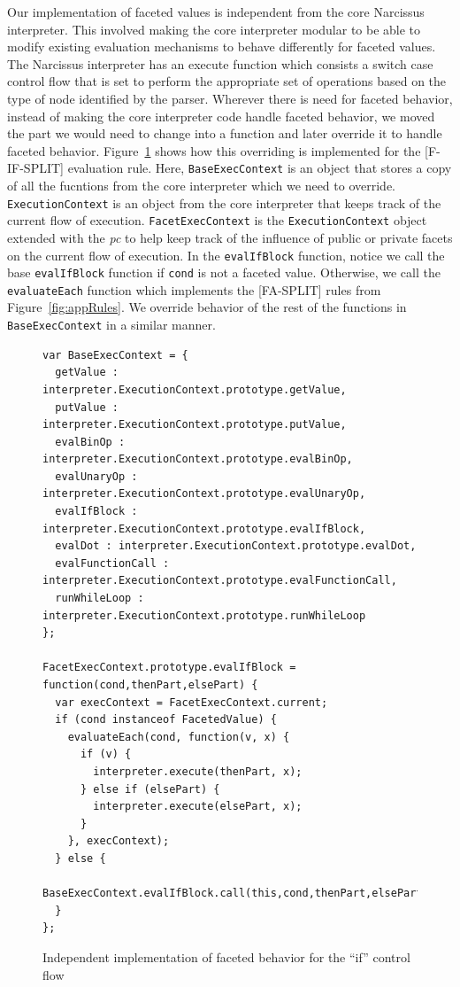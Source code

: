 Our implementation of faceted values is independent from the core Narcissus interpreter.
This involved making the core interpreter modular to be able to modify existing
evaluation mechanisms to behave differently for faceted values. The Narcissus interpreter
has an execute function which consists a switch case control flow that is set to
perform the appropriate set of operations based on the type of node identified by
the parser. Wherever there is need for faceted behavior, instead of making the core
interpreter code handle faceted behavior, we moved the part we would need to change
into a function and later override it to handle faceted behavior.
Figure~\ref{fig:facetif} shows how this overriding is implemented for the [F-IF-SPLIT]
evaluation rule. Here, \texttt{BaseExecContext} is an object that stores a copy of all the
fucntions from the core interpreter which we need to override. \texttt{ExecutionContext}
is an object from the core interpreter that keeps track of the current flow of execution.
\texttt{FacetExecContext} is the \texttt{ExecutionContext} object extended with
the \textit{pc} to help keep track of the influence of public or private facets
on the current flow of execution. In the \texttt{evalIfBlock} function, notice we
call the base \texttt{evalIfBlock} function if \texttt{cond} is not a faceted value.
Otherwise, we call the \texttt{evaluateEach} function which implements the [FA-SPLIT]
rules from Figure~\ref{fig:appRules}. We override behavior of the rest of the functions
in \texttt{BaseExecContext} in a similar manner.
\lstset{
  language=javascript,
  frame=single,
  breaklines=true,
  basicstyle=\footnotesize\ttfamily,
  numbers=left,
  extendedchars=true,
  tabsize=2
}
\begin{figure}
  \begin{lstlisting}
var BaseExecContext = {
  getValue : interpreter.ExecutionContext.prototype.getValue,
  putValue : interpreter.ExecutionContext.prototype.putValue,
  evalBinOp : interpreter.ExecutionContext.prototype.evalBinOp,
  evalUnaryOp : interpreter.ExecutionContext.prototype.evalUnaryOp,
  evalIfBlock : interpreter.ExecutionContext.prototype.evalIfBlock,
  evalDot : interpreter.ExecutionContext.prototype.evalDot,
  evalFunctionCall : interpreter.ExecutionContext.prototype.evalFunctionCall,
  runWhileLoop : interpreter.ExecutionContext.prototype.runWhileLoop
};

FacetExecContext.prototype.evalIfBlock = function(cond,thenPart,elsePart) {
  var execContext = FacetExecContext.current;
  if (cond instanceof FacetedValue) {
    evaluateEach(cond, function(v, x) {
      if (v) {
        interpreter.execute(thenPart, x);
      } else if (elsePart) {
        interpreter.execute(elsePart, x);
      }
    }, execContext);
  } else {
    BaseExecContext.evalIfBlock.call(this,cond,thenPart,elsePart);
  }
};
  \end{lstlisting}
  \caption{Independent implementation of faceted behavior for the ``if'' control flow}
  \label{fig:facetif}
\end{figure}

